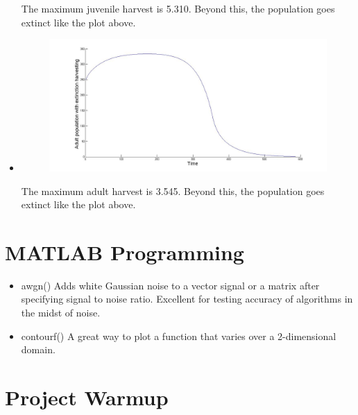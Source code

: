\documentclass[a4paper]{article}
\begin{document}
\begin{itemize}
  	 The maximum juvenile harvest is 5.310. Beyond this, the population goes extinct like the plot above.

  \item	 \begin{figure}[H]
  	 	\centering
  	 	\includegraphics[width=12cm]{A}
  	 \end{figure}  	 
  	 The maximum adult harvest is 3.545. Beyond this, the population goes extinct like the plot above.
  	 \end{itemize}
\section{MATLAB Programming}

\begin{itemize}
	\item awgn()
	Adds white Gaussian noise to a vector signal or a matrix after specifying signal to noise ratio. Excellent for testing accuracy of algorithms in the midst of noise.
	\item contourf()
	A great way to plot a function that varies over a 2-dimensional domain.
\end{itemize}

\section{Project Warmup}
\end{document}
